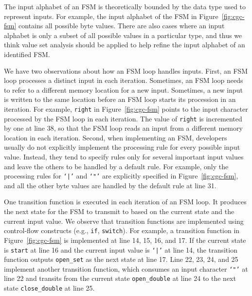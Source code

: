 The input alphabet of an FSM is theoretically bounded by 
the data type used to represent inputs. 
For example, the input alphabet of the FSM
in Figure~\ref{fig:cgc-fsm} contains all possible byte values.
There are also cases where an input alphabet is only a subset 
of all possible values in a particular type, 
and thus we think value set analysis should be applied to help refine
the input alphabet of an identified FSM.


We have two observations about how an FSM loop handles inputs. 
First, an FSM loop processes a distinct input in each iteration.
Sometimes, an FSM loop needs to refer to a different 
memory location for a new input.
Sometimes, a new input is written to the same
location before an FSM loop 
starts its procession in an iteration.
For example, \texttt{right} in Figure~\ref{fig:cgc-fsm} 
points to the input character
processed by the FSM loop in each iteration.
The value of \texttt{right} is incremented by one at line 38,
so that the FSM loop reads an input from a different memory 
location in each iteration.
Second, when implementing an FSM,
developers usually do not explicitly implement the 
processing rule for every possible input value. 
Instead,
they tend to specify rules only for several important input values and 
leave the others to be handled by a default rule.
For example, only the processing rules for \texttt{`|'} and \texttt{`"'}
are explicitly specified in Figure~\ref{fig:cgc-fsm},
and all the other byte values are handled by
the default rule at line 31.


One transition function is executed in each iteration of an FSM loop. 
It produces the next state for the FSM to transmit to based on 
the current state and the current input value. 
We observe that transition functions are implemented
using control-flow constructs (e.g., \texttt{if}, \texttt{switch}).
For example, a transition function in Figure~\ref{fig:cgc-fsm}
is implemented at line 14, 15, 16, and 17.
If the current state is \texttt{start}
at line 16 and the current input value is
\texttt{`|'} at line 14, the transition function outputs \texttt{open\_set}
as the next state at line 17.
Line 22, 23, 24, and 25 implement another transition function,
which consumes an input character \texttt{`"'} at line 22 and
transits from the current state
\texttt{open\_double} at line 24 to
the next state \texttt{close\_double} at line 25.



